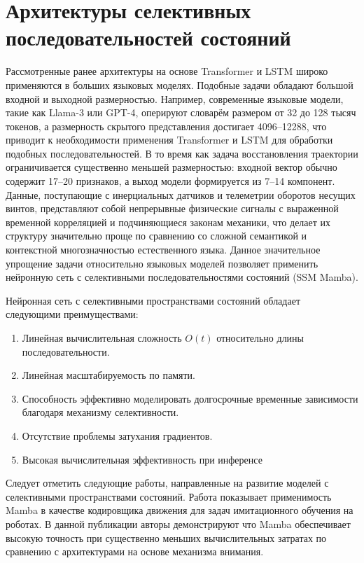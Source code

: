 \section{Архитектуры селективных последовательностей состояний}
\label{sec:1.5}

Рассмотренные ранее архитектуры на основе Transformer и LSTM широко применяются в больших языковых моделях. Подобные задачи обладают большой входной и выходной размерностью. Например, современные языковые модели, такие как Llama-3 или GPT-4, оперируют словарём размером от 32 до 128 тысяч токенов, а размерность скрытого представления достигает 4096--12288, что приводит к необходимости применения Transformer и LSTM для обработки подобных последовательностей. В то время как задача восстановления траектории ограничивается существенно меньшей размерностью: входной вектор обычно содержит 17--20 признаков, а выход модели формируется из 7--14 компонент. Данные, поступающие с инерциальных датчиков и телеметрии оборотов несущих винтов, представляют собой непрерывные физические сигналы с выраженной временной корреляцией и подчиняющиеся законам механики, что делает их структуру значительно проще по сравнению со сложной семантикой и контекстной многозначностью естественного языка. Данное значительное упрощение задачи относительно языковых моделей позволяет применить нейронную сеть с селективными последовательностями состояний (SSM Mamba)\cite{Gu2024}.

Нейронная сеть с селективными пространствами состояний обладает следующими преимуществами:
 \begin{enumerate}
	\item Линейная вычислительная сложность \(O(t)\) относительно длины последовательности.
	\item Линейная масштабируемость по памяти.
	\item Способность эффективно моделировать долгосрочные временные зависимости благодаря механизму селективности.
	\item Отсутствие проблемы затухания градиентов.
	\item Высокая вычислительная эффективность при инференсе
\end{enumerate}

Следует отметить следующие работы, направленные на развитие моделей с селективными пространствами состояний. Работа \cite{Tsuji2025} показывает применимость Mamba в качестве кодировщика движения для задач имитационного обучения на роботах. В данной публикации авторы демонстрируют что Mamba обеспечивает высокую точность при существенно меньших вычислительных затратах по сравнению с архитектурами на основе механизма внимания. 


